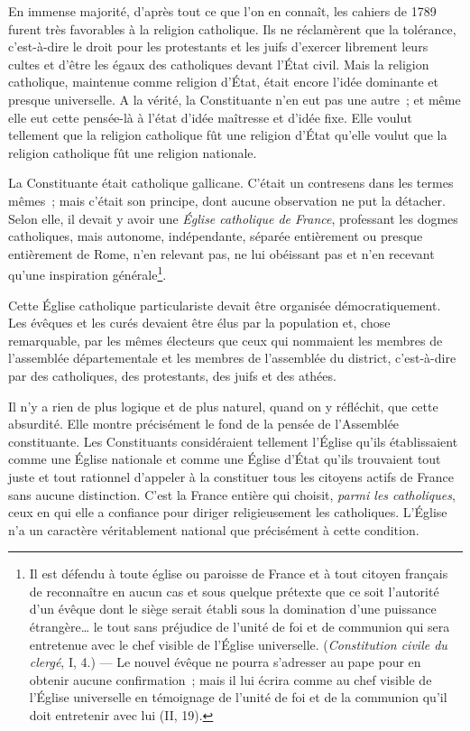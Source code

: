 \documentclass[french,twoside]{book} %
\begin{document}
\noindent En immense majorité, d’après tout ce que l’on en connaît, les cahiers de 1789 furent très favorables à la religion catholique. Ils ne réclamèrent que la tolérance, c’est-à-dire le droit pour les protestants et les juifs d’exercer librement leurs cultes et d’être les égaux des catholiques devant l’État civil. Mais la religion catholique, maintenue comme religion d’État, était encore l’idée dominante et presque universelle. A la vérité, la Constituante n’en eut pas une autre ; et même elle eut cette pensée-là à l’état d’idée maîtresse et d’idée fixe. Elle voulut tellement que la religion catholique fût une religion d’État qu’elle voulut que la religion catholique fût une religion nationale.\par
La Constituante était catholique gallicane. C’était un contresens dans les termes mêmes ; mais  c’était son principe, dont aucune observation ne put la détacher. Selon elle, il devait y avoir une {\itshape Église catholique de France}, professant les dogmes catholiques, mais autonome, indépendante, séparée entièrement ou presque entièrement de Rome, n’en relevant pas, ne lui obéissant pas et n’en recevant qu’une inspiration générale\footnote{Il est défendu à toute église ou paroisse de France et à tout citoyen français de reconnaître en aucun cas et sous quelque prétexte que ce soit l’autorité d’un évêque dont le siège serait établi sous la domination d’une puissance étrangère… le tout sans préjudice de l’unité de foi et de communion qui sera entretenue avec le chef visible de l’Église universelle. (\emph{Constitution civile du clergé}, I, 4.) — Le nouvel évêque ne pourra s’adresser au pape pour en obtenir aucune confirmation ; mais il lui écrira comme au chef visible de l’Église universelle en témoignage de l’unité de foi et de la communion qu’il doit entretenir avec lui (II, 19).}.\par
Cette Église catholique particulariste devait être organisée démocratiquement. Les évêques et les curés devaient être élus par la population et, chose remarquable, par les mêmes électeurs que ceux qui nommaient les membres de l’assemblée départementale et les membres de l’assemblée du district, c’est-à-dire par des catholiques, des protestants, des juifs et des athées.\par
Il n’y a rien de plus logique et de plus naturel, quand on y réfléchit, que cette absurdité. Elle montre précisément le fond de la pensée de l’Assemblée constituante. Les Constituants considéraient  tellement l’Église qu’ils établissaient comme une Église nationale et comme une Église d’État qu’ils trouvaient tout juste et tout rationnel d’appeler à la constituer tous les citoyens actifs de France sans aucune distinction. C’est la France entière qui choisit, {\itshape parmi les catholiques}, ceux en qui elle a confiance pour diriger religieusement les catholiques. L’Église n’a un caractère véritablement national que précisément à cette condition.\par
\end{document}
